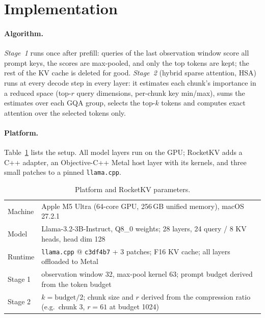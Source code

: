 \documentclass[10pt,letterpaper]{article}
\newcommand{\code}[1]{\texttt{#1}}
\begin{document}
\section{Implementation}
\label{sec:impl}

\paragraph{Algorithm.}
\emph{Stage~1} runs once after prefill: queries of the last observation window score all prompt keys, the scores are max-pooled, and only the top tokens are kept; the rest of the KV cache is deleted for good.
\emph{Stage~2} (hybrid sparse attention, HSA) runs at every decode step in every layer: it estimates each chunk's importance in a reduced space (top-$r$ query dimensions, per-chunk key min/max), sums the estimates over each GQA group, selects the top-$k$ tokens and computes exact attention over the selected tokens only.

\paragraph{Platform.}
Table~\ref{tab:platform} lists the setup. All model layers run on the GPU; RocketKV adds a C++ adapter, an Objective-C++ Metal host layer with its kernels, and three small patches to a pinned \code{llama.cpp}.

\begin{table}[h]
\centering\small
\caption{Platform and RocketKV parameters.}
\label{tab:platform}
\setlength{\tabcolsep}{4pt}
\begin{tabular}{ll}
\toprule
Machine & Apple M5 Ultra (64-core GPU, 256\,GB unified memory), macOS 27.2.1 \\
Model & Llama-3.2-3B-Instruct, Q8\_0 weights; 28 layers, 24 query / 8 KV heads, head dim 128 \\
Runtime & \code{llama.cpp} @ \code{c3df4b7} + 3 patches; F16 KV cache; all layers offloaded to Metal \\
Stage 1 & observation window 32, max-pool kernel 63; prompt budget derived from the token budget \\
Stage 2 & $k = \text{budget}/2$; chunk size and $r$ derived from the compression ratio (e.g.\ chunk 3, $r=61$ at budget 1024) \\
\bottomrule
\end{tabular}
\end{table}
\end{document}

